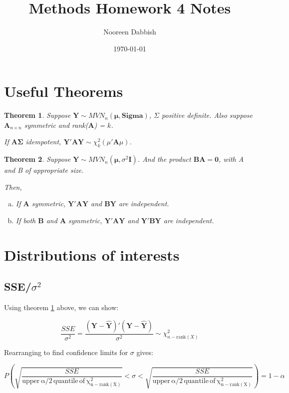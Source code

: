 \documentclass[11pt]{article}
\title{Methods Homework 4 Notes}
\author{Nooreen Dabbish}
\date{\today}
\newtheorem{theorem}{Theorem}
\begin{document}
\maketitle


\section{Useful Theorems}
\label{sec-1}


\begin{theorem}
\label{thm:idemchi}
Suppose $\mathbf{Y} \sim MVN_n(\mathbf{\mu}, \mathbf{Sigma})$, $\Sigma$ positive definite. 
Also suppose $\mathbf{A}_{n \times n}$ symmetric and rank($\mathbf{A}$) = $k$.

If $\mathbf{A\Sigma}$ idempotent, $\mathbf{Y'AY} \sim \chi^2_k (\mu'\mathbf{A}\mu)$.

\end{theorem}

\begin{theorem}
Suppose $\mathbf{Y} \sim MVN_n(\mathbf{\mu}, \sigma^2\mathbf{I})$. And the product $\mathbf{BA}=\mathbf{0}$, with A and B of appropriate size.

Then,

\begin{enumerate}[(a)]
\item If $\mathbf{A}$ symmetric, $\mathbf{Y'AY}$ and $\mathbf{BY}$ are independent.
\item If both $\mathbf{B}$ and $\mathbf{A}$ symmetric, $\mathbf{Y'AY}$ and $\mathbf{Y'BY}$ are independent.
\end{enumerate}

\end{theorem}
\section{Distributions of interests}
\label{sec-2}
\subsection{SSE/$\sigma$$^2$}
\label{sec-2-1}


Using theorem \ref{thm:idemchi} above, we can show:

$$\frac{SSE}{\sigma^2} = \frac{(\mathbf{Y} -
\hat{\mathbf{Y}})'(\mathbf{Y} - \hat{\mathbf{Y}})}{\sigma^2} \sim
\chi^2_{n-\text{rank}(X)}$$

Rearranging to find confidence limits for $\sigma$ gives:

$$P\left(\sqrt{\frac{SSE}{\mathrm{upper\, \alpha/2\, quantile\, of\,
\chi^2_{n-\mathrm{rank}(X)}}}} < \sigma < \sqrt{\frac{SSE}{\mathrm{upper\, \alpha/2\, quantile\, of\, \chi^2_{n-\mathrm{rank}(X)}}}} \right)
= 1 - \alpha$$
\end{document}
